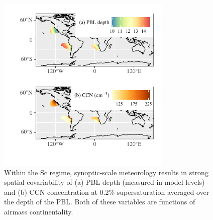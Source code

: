 \documentclass[acp, manuscript]{copernicus}\usepackage[]{graphicx}\usepackage[]{xcolor}
\newenvironment{knitrout}{}{} %
\begin{document}
\begin{figure}
  \centering

  
\begin{knitrout}
\color{fgcolor}

{\centering \includegraphics[width=8.3cm]{figure/covariability-space-plot-1} 

}


\end{knitrout}
  \caption{Within the Sc regime, synoptic-scale meteorology results in strong
    spatial covariability of (a) PBL depth (measured in model levels) and (b)
    CCN concentration at 0.2\% supersaturation averaged over the depth of the
    PBL.  Both of these variables are functions of airmass continentality.}
  \label{fig:covariability-space}
\end{figure}
%
\clearpage
%
\end{document}
